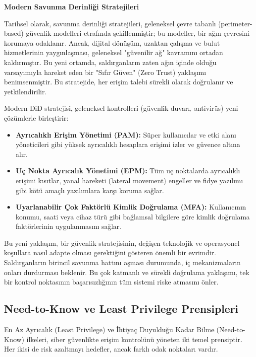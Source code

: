 \textbf{Modern Savunma Derinliği Stratejileri}

Tarihsel olarak, savunma derinliği stratejileri, geleneksel çevre tabanlı (perimeter-based) güvenlik modelleri etrafında şekillenmiştir; bu modeller, bir ağın çevresini korumaya odaklanır. Ancak, dijital dönüşüm, uzaktan çalışma ve bulut hizmetlerinin yaygınlaşması, geleneksel "güvenilir ağ" kavramını ortadan kaldırmıştır. Bu yeni ortamda, saldırganların zaten ağın içinde olduğu varsayımıyla hareket eden bir "Sıfır Güven" (Zero Trust) yaklaşımı benimsenmiştir. Bu stratejide, her erişim talebi sürekli olarak doğrulanır ve yetkilendirilir.

Modern DiD stratejisi, geleneksel kontrolleri (güvenlik duvarı, antivirüs) yeni çözümlerle birleştirir:

\begin{itemize}
    \item \textbf{Ayrıcalıklı Erişim Yönetimi (PAM):} Süper kullanıcılar ve etki alanı yöneticileri gibi yüksek ayrıcalıklı hesaplara erişimi izler ve güvence altına alır.
    \item \textbf{Uç Nokta Ayrıcalık Yönetimi (EPM):} Tüm uç noktalarda ayrıcalıklı erişimi kısıtlar, yanal hareketi (lateral movement) engeller ve fidye yazılımı gibi kötü amaçlı yazılımlara karşı koruma sağlar.
    \item \textbf{Uyarlanabilir Çok Faktörlü Kimlik Doğrulama (MFA):} Kullanıcının konumu, saati veya cihaz türü gibi bağlamsal bilgilere göre kimlik doğrulama faktörlerinin uygulanmasını sağlar.
\end{itemize}

Bu yeni yaklaşım, bir güvenlik stratejisinin, değişen teknolojik ve operasyonel koşullara nasıl adapte olması gerektiğini gösteren önemli bir evrimdir. Saldırganların birincil savunma hattını aşması durumunda, iç mekanizmaların onları durdurması beklenir. Bu çok katmanlı ve sürekli doğrulama yaklaşımı, tek bir kontrol noktasının başarısızlığının tüm sistemi riske atmasını önler.

\subsection{Need-to-Know ve Least Privilege Prensipleri}

En Az Ayrıcalık (Least Privilege) ve İhtiyaç Duyulduğu Kadar Bilme (Need-to-Know) ilkeleri, siber güvenlikte erişim kontrolünü yöneten iki temel prensiptir. Her ikisi de risk azaltmayı hedefler, ancak farklı odak noktaları vardır.


